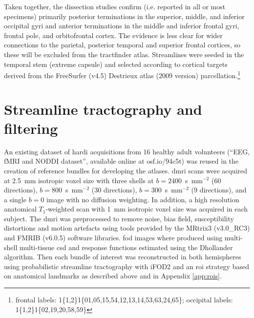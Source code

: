 \documentclass[12pt,phd,a4paper,twoside]{ucl_thesis}
\begin{document}
Taken together, the dissection studies confirm (i.e. reported in all or most specimens) primarily posterior terminations in the superior, middle, and inferior occipital gyri and anterior terminations in the middle and inferior frontal gyri, frontal pole, and orbitofrontal cortex.
The evidence is less clear for wider connections to the parietal, posterior temporal and superior frontal cortices, so these will be excluded from the tractfinder atlas.
Streamlines were seeded in the temporal stem (extreme capsule) and selected according to cortical targets derived from the FreeSurfer (v4.5) Destrieux atlas\autocite{Destrieux2010} (2009 version) parcellation.\footnote[2]{frontal labels: 1\{1,2\}1\{01,05,15,54,12,13,14,53,63,24,65\}; occipital labels: 1\{1,2\}1\{02,19,20,58,59\}}

\section{Streamline tractography and filtering}\label{sec:atlasmethods}

An existing dataset of \gls{hardi} acquisitions from 16 healthy adult volunteers (``EEG, fMRI and NODDI dataset''\autocite{Clayden2020}, available online at osf.io/94c5t) was reused in the creation of reference bundles for developing the atlases.
\Gls{dmri} scans were acquired at 2.5~mm isotropic voxel size with three shells at $b=2400$~s~mm$^{-2}$ (60 directions), $b=800$~s~mm$^{-2}$ (30 directions), $b=300$~s~mm$^{-2}$ (9 directions), and a single $b=0$ image with no diffusion weighting.
In addition, a high resolution anatomical $T_1$-weighted scan with 1~mm isotropic voxel size was acquired in each subject.
The \gls{dmri} was preprocessed to remove noise, bias field, susceptibility distortions and motion artefacts using tools provided by the MRtrix3 (v3.0\_RC3) and FMRIB (v6.0.5) software libraries.
\Gls{fod} images where produced using multi-shell multi-tissue \gls{csd}\autocite{Jeurissen2014,Tournier2019} and response functions estimated using the Dhollander algorithm\autocite{Dhollander2016}.
Then each bundle of interest was reconstructed in both hemispheres using probabilistic streamline tractography with iFOD2 \autocite{Tournier2010} and an \gls{roi} strategy based on anatomical landmarks as described above and in Appendix \ref{app:rois}.
\end{document}
